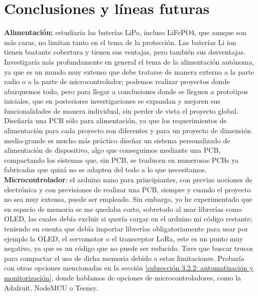 \documentclass[12pt]{article}
\begin{document}
	\pagebreak
	
	\section[Conclusiones y líneas futuras]{Conclusiones y líneas futuras}
	
	\noindent \textbf{Alimentación:} estudiaría las baterías LiPo, incluso LiFePO4, que aunque son más caras, no limitan tanto en el tema de la protección. Las baterías Li ion tienen bastante cobertura y tienen sus ventajas, pero también sus desventajas. Investigaría más profundamente en general el tema de la alimentación autónoma, ya que es un mundo muy extenso que debe tratarse de manera externa a la parte radio o a la parte de microcontrolador; podemos realizar proyectos donde abarquemos todo, pero para llegar a conclusiones donde se lleguen a prototipos iniciales, que en posteriores investigaciones se expandan y mejoren sus funcionalidades de manera individual, sin perder de vista el proyecto global. Diseñaría una PCB sólo para alimentación, ya que los requerimientos de alimentación para cada proyecto son diferentes y para un proyecto de dimensión media-grande es mucho más práctico diseñar un sistema personalizado de alimentación de dispositivo, algo que conseguimos mediante una PCB, compactando los sistemas que, sin PCB, se traducen en numerosas PCBs ya fabricadas que quizá no se adapten del todo a lo que necesitamos. \\
	
	\noindent \textbf{Microcontrolador}: el arduino nano para principiantes, con previas nociones de electrónica y con previsiones de realizar una PCB, siempre y cuando el proyecto no sea muy extenso, puede ser empleado. Sin embargo, yo he experimentado que en espacio de memoria se me quedaba corto, sobretodo al usar librerías como OLED, las cuales debía excluir si quería cargar en el arduino mi código restante; teniendo en cuenta que debía importar librerías obligatoriamente para usar por ejemplo la OLED, el servomotor o el transceptor LoRa, este es un punto muy negativo, ya que es un código que no puede ser reducido. Tuve que buscar trucos para compactar el uso de dicha memoria debido a estas limitaciones. Probaría con otras opciones mencionadas en la sección \ref{subsección 3.2.2: automatización y monitorización}, donde hablamos de opciones de microcontroladores, como la Adafruit, NodeMCU o Teensy. \\
	
\end{document}
